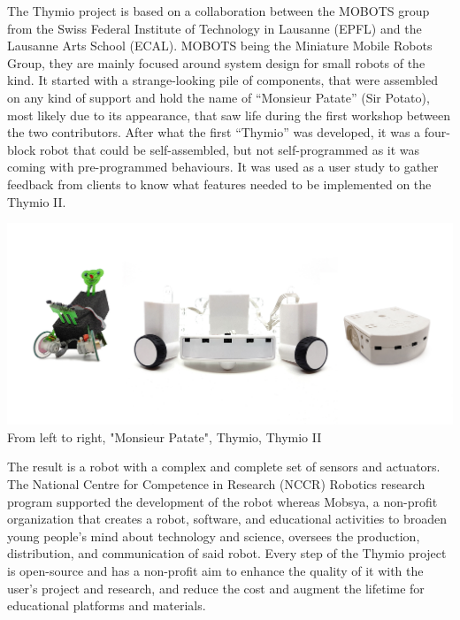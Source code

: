 \documentclass{scrbook}
\begin{document}
The Thymio project is based on a collaboration between the MOBOTS group from the Swiss Federal Institute of Technology in Lausanne (EPFL) and the Lausanne Arts School (ECAL).
MOBOTS being the Miniature Mobile Robots Group, they are mainly focused around system design for small robots of the kind. It started with a strange-looking pile of components, 
that were assembled on any kind of support and hold the name of “Monsieur Patate” (Sir Potato), most likely due to its appearance, 
that saw life during the first workshop between the two contributors. After what the first “Thymio” was developed, 
it was a four-block robot that could be self-assembled, but not self-programmed as it was coming with pre-programmed behaviours. 
It was used as a user study to gather feedback from clients to know what features needed to be implemented on the Thymio II.\\

\begin{center}
  \includegraphics[width=\textwidth]{prototype_thymio_old}\\
  From left to right, "Monsieur Patate", Thymio, Thymio II
\end{center}

The result is a robot with a complex and complete set of sensors and actuators. 
The National Centre for Competence in Research (NCCR) Robotics research program supported the development of the robot whereas Mobsya, 
a non-profit organization that creates a robot, software, and educational activities to broaden young people's mind about technology and science, 
oversees the production, distribution, and communication of said robot. 
Every step of the Thymio project is open-source and has a non-profit aim to enhance the quality of it with the user's project and research, 
and reduce the cost and augment the lifetime for educational platforms and materials.
\end{document}

